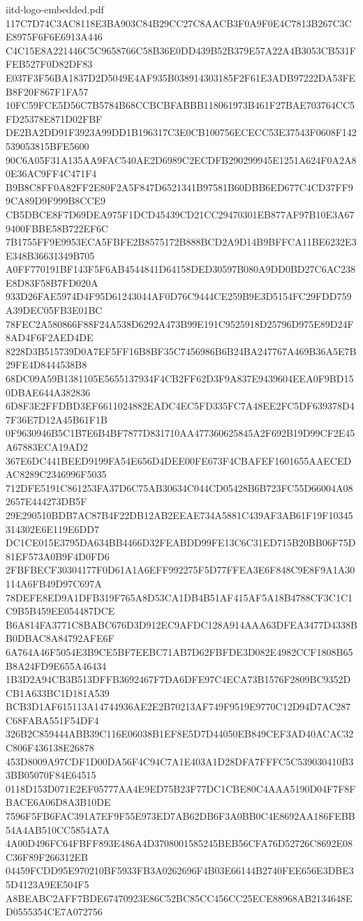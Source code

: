 \begin{filecontents*}[overwrite]{iitd-logo-embedded.pdf}
117C7D74C3AC8118E3BA903C84B29CC27C8AACB3F0A9F0E4C7813B267C3CE8975F6F6E6913A446
C4C15E8A221446C5C9658766C58B36E0DD439B52B379E57A22A4B3053CB531FFEB527F0D82DF83
E037F3F56BA1837D2D5049E4AF935B038914303185F2F61E3ADB97222DA53FEB8F20F867F1FA57
10FC59FCE5D56C7B5784B68CCBCBFABBB118061973B461F27BAE703764CC5FD25378E871D02FBF
DE2BA2DD91F3923A99DD1B196317C3E0CB100756ECECC53E37543F0608F142539053815BFE5600
90C6A05F31A135AA9FAC540AE2D6989C2ECDFB290299945E1251A624F0A2A80E36AC9FF4C471F4
B9B8C8FF0A82FF2E80F2A5F847D6521341B97581B60DBB6ED677C4CD37FF99CA89D9F999B8CCE9
CB5DBCE8F7D69DEA975F1DCD45439CD21CC29470301EB877AF97B10E3A679400FBBE58B722EF6C
7B1755FF9E9953ECA5FBFE2B8575172B888BCD2A9D14B9BFFCA11BE6232E3E348B36631349B705
A0FF770191BF143F5F6AB4544841D64158DED30597B080A9DD0BD27C6AC238E8D83F58B7FD020A
933D26FAE5974D4F95D61243044AF0D76C9444CE259B9E3D5154FC29FDD759A39DEC05FB3E01BC
78FEC2A580866F88F24A538D6292A473B99E191C9525918D25796D975E89D24F8AD4F6F2AED4DE
8228D3B515739D0A7EF5FF16B8BF35C7456986B6B24BA247767A469B36A5E7B29FE4D8444538B8
68DC09A59B1381105E5655137934F4CB2FF62D3F9A837E9439604EEA0F9BD150DBAE644A382836
6D8F3E2FFDBD3EF6611024882EADC4EC5FD335FC7A48EE2FC5DF639378D47F36E7D12A45B61F1B
0F9630946B5C1B7E6B4BF7877D831710AA477360625845A2F692B19D99CF2E45A67883ECA19AD2
367E6DC441BEED9199FA54E656D4DEE00FE673F4CBAFEF1601655AAECEDAC8289C2346996F5035
712DFE5191C861253FA37D6C75AB30634C044CD05428B6B723FC55D66004A082657E444273DB5F
29E290510BDB7AC87B4F22DB12AB2EEAE734A5881C439AF3AB61F19F10345314302E6E119E6DD7
DC1CE015E3795DA634BB4466D32FEABDD99FE13C6C31ED715B20BB06F75D81EF573A0B9F4D0FD6
2FBFBECF30304177F0D61A1A6EFF992275F5D77FFEA3E6F848C9E8F9A1A30114A6FB49D97C697A
78DEFE8ED9A1DFB319F765A8D53CA1DB4B51AF415AF5A18B4788CF3C1C1C9B5B459EE054487DCE
B6A814FA3771C8BABC676D3D912EC9AFDC128A914AAA63DFEA3477D4338BB0DBAC8A84792AFE6F
6A764A46F5054E3B9CE5BF7EEBC71AB7D62FBFDE3D082E4982CCF1808B65B8A24FD9E655A46434
1B3D2A94CB3B513DFFB3692467F7DA6DFE97C4ECA73B1576F2809BC9352DCB1A633BC1D181A539
BCB3D1AF615113A14744936AE2E2B70213AF749F9519E9770C12D94D7AC287C68FABA551F54DF4
326B2C859444ABB39C116E06038B1EF8E5D7D44050EB849CEF3AD40ACAC32C806F436138E26878
453D8009A97CDF1D00DA56F4C94C7A1E403A1D28DFA7FFFC5C539030410B33BB05070F84E64515
0118D153D071E2EF05777AA4E9ED75B23F77DC1CBE80C4AAA5190D04F7F8FBACE6A06D8A3B10DE
7596F5FB6FAC391A7EF9F55E973ED7AB62DB6F3A0BB0C4E8692AA186FEBB54A4AB510CC5854A7A
4A00D496FC64FBFF893E486A4D3708001585245BEB56CFA76D52726C8692E08C36F89F266312EB
04459FCDD95E970210BF5933FB3A0262696F4B03E66144B2740FEE656E3DBE35D4123A9EE504F5
A8BEABC2AFF7BDE67470923E86C52BC85CC456CC25ECE88968AB2134648ED0555354CE7A072756

\end{filecontents*}
